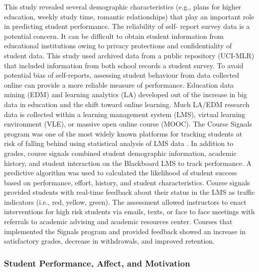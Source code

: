 \documentclass[sigconf]{acmart}
\begin{document}
This study revealed several demographic characteristics (e.g., plans for 
higher education, weekly study time, romantic relationships) that play an
important role in predicting student performance. The reliability of self-
report survey data is a potential concern. It can be difficult to obtain 
student information from educational institutions owing to privacy protections 
and confidentiality of student data. This study used archived data from a 
public repository (UCI-MLR) that included information from both school records 
a student survey. To avoid potential bias of self-reports, assessing student 
behaviour from data collected online can provide a more reliable measure of
performance. Education data mining (EDM) and learning analytics (LA) developed 
out of the increase in big data in education and the shift toward online 
learning. Much LA/EDM research data is collected within a learning management 
system (LMS), virtual learning environment (VLE), or massive open online 
course (MOOC). The Course Signals program was one of the most widely known 
platforms for tracking students at risk of falling behind using statistical 
analysis of LMS data \cite{arnoldPistilli12}. In addition to grades, course
signals combined student demographic information, academic history, and student 
interaction on the Blackboard LMS to track performance. A predictive algorithm 
was used to calculated the likelihood of student success based on performance, 
effort, history, and student characteristics. Course signals provided students 
with real-time feedback about their status in the LMS as traffic indicators 
(i.e., red, yellow, green). The assessment allowed instructors to enact 
interventions for high risk students via emails, texts, or face to face 
meetings with referrals to academic advising and academic resources center.
Courses that implemented the Signals program and provided feedback showed an 
increase in satisfactory grades, decrease in withdrawals, and improved retention. 


\subsubsection{Student Performance, Affect, and Motivation}
\end{document}
